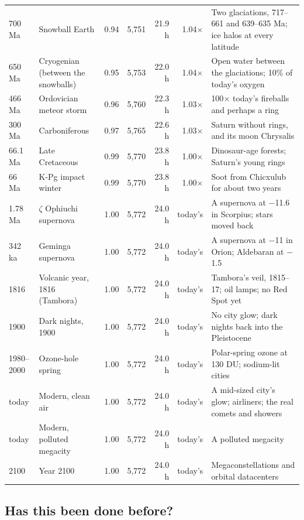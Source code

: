 \documentclass[9pt,twocolumn]{extarticle}
\begin{document}
\begin{table}[tp]
\begin{tabularx}{\textwidth}{@{}llrrrrY@{}}
700 Ma & Snowball Earth & 0.94 & 5,751 & 21.9 h & 1.04$\times$ & Two glaciations, 717--661 and 639--635 Ma; ice halos at every latitude \\
650 Ma & Cryogenian (between the snowballs) & 0.95 & 5,753 & 22.0 h & 1.04$\times$ & Open water between the glaciations; 10\% of today's oxygen \\
466 Ma & Ordovician meteor storm & 0.96 & 5,760 & 22.3 h & 1.03$\times$ & 100$\times$ today's fireballs and perhaps a ring \\
300 Ma & Carboniferous & 0.97 & 5,765 & 22.6 h & 1.03$\times$ & Saturn without rings, and its moon Chrysalis \\
66.1 Ma & Late Cretaceous & 0.99 & 5,770 & 23.8 h & 1.00$\times$ & Dinosaur-age forests; Saturn's young rings \\
66 Ma & K-Pg impact winter & 0.99 & 5,770 & 23.8 h & 1.00$\times$ & Soot from Chicxulub for about two years \\
1.78 Ma & $\zeta$ Ophiuchi supernova & 1.00 & 5,772 & 24.0 h & today's & A supernova at $-$11.6 in Scorpius; stars moved back \\
342 ka & Geminga supernova & 1.00 & 5,772 & 24.0 h & today's & A supernova at $-$11 in Orion; Aldebaran at $-$1.5 \\
1816 & Volcanic year, 1816 (Tambora) & 1.00 & 5,772 & 24.0 h & today's & Tambora's veil, 1815--17; oil lamps; no Red Spot yet \\
1900 & Dark nights, 1900 & 1.00 & 5,772 & 24.0 h & today's & No city glow; dark nights back into the Pleistocene \\
1980--2000 & Ozone-hole spring & 1.00 & 5,772 & 24.0 h & today's & Polar-spring ozone at 130 DU; sodium-lit cities \\
today & Modern, clean air & 1.00 & 5,772 & 24.0 h & today's & A mid-sized city's glow; airliners; the real comets and showers \\
today & Modern, polluted megacity & 1.00 & 5,772 & 24.0 h & today's & A polluted megacity \\
2100 & Year 2100 & 1.00 & 5,772 & 24.0 h & today's & Megaconstellations and orbital datacenters \\
\bottomrule\end{tabularx}
\end{table}


\subsection{Has this been done before?}\label{done-before}
\end{document}

